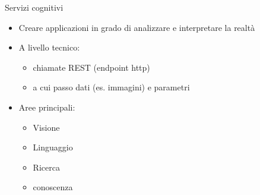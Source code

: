 %
\begin{frame}[t]{Servizi cognitivi}
\begin{itemize}
	\item Creare applicazioni in grado di analizzare e interpretare la realtà
	\item A livello tecnico:
	\begin{itemize}
		\item chiamate REST (endpoint http)
		\item a cui passo dati (es. immagini) e parametri
	\end{itemize}
	\item Aree principali:
	\begin{itemize}
		\item Visione
		\item Linguaggio
		\item Ricerca
		\item conoscenza
	\end{itemize}
\end{itemize}
\end{frame}
%
